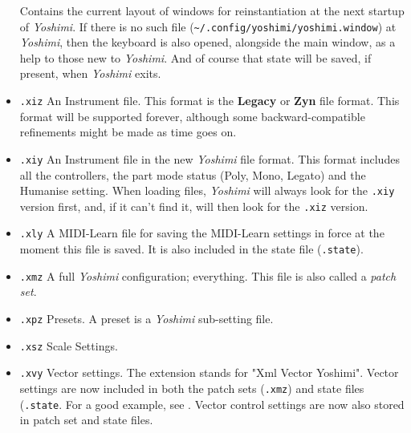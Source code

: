 \begin{itemize}
         Contains the current layout of windows for reinstantiation at the next
         startup of \textsl{Yoshimi}.
         If there is no such file
         (\texttt{\textasciitilde/.config/yoshimi/yoshimi.window}) at
         \textsl{Yoshimi}, then the keyboard is also opened, alongside the main
         window, as a help to those new to \textsl{Yoshimi}.
         And of course that state will be saved, if present, when
         \textsl{Yoshimi} exits.
      \item \texttt{.xiz}
         An Instrument file.  This format is the \textbf{Legacy} or \textbf{Zyn}
         file format.  This format will be supported forever, although some
         backward-compatible refinements might be made as time goes on.
      \item \texttt{.xiy}
         An Instrument file in the new \textsl{Yoshimi} file format.
         This format includes all the        
         controllers, the part mode status (Poly, Mono, Legato) and the
         Humanise setting.
         When loading files, \textsl{Yoshimi} will always look for
         the \texttt{.xiy} version first, and,
         if it can't find it, will then look for the \texttt{.xiz} version.
      \item \texttt{.xly}
         A MIDI-Learn file for saving the MIDI-Learn settings in force at the
         moment this file is saved.  It is also included in the state file
         (\texttt{.state}).
      \item \texttt{.xmz}
         A full \textsl{Yoshimi} configuration; everything.
         This file is also called a \textsl{patch set}.
      \item \texttt{.xpz}
         Presets.
         A preset is a \textsl{Yoshimi} sub-setting file.
      \item \texttt{.xsz}
         Scale Settings.
      \item \texttt{.xvy}
         Vector settings. The extension stands for "Xml Vector Yoshimi".
         Vector settings are now included in both the patch sets
         (\texttt{.xmz}) and state files (\texttt{.state}.
         For a good example, see .
         Vector control settings are now also stored in patch set and state
         files.
   \end{itemize}

